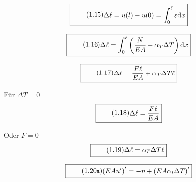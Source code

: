 \documentclass[11pt]{article}
\newcommand{\1}{ {\mathds{1}} }
\begin{document}
    \begin{equation}
      \boxed{
        \tag{1.15}
        \begin{split}
          \Delta \ell
          =
          u(l)
          -
          u(0)
          =
          \int_{0}^{\ell}
          \varepsilon
          \text{d}x
        \end{split}
      }
    \end{equation}
     
    \begin{equation}
      \boxed{
        \tag{1.16}
        \begin{split}
          \Delta \ell
          =
          \int_{0}^{\ell}
          \left(
            \frac{N}{EA}
            +
            \alpha_T \Delta T
          \right)
          \text{d}x
        \end{split}
      }
    \end{equation}

    \begin{equation}
      \boxed{
        \tag{1.17}
        \begin{split}
          \Delta \ell
          =
          \frac{F\ell}{EA}
          +
          \alpha_T \Delta T \ell
        \end{split}
      }
    \end{equation}


    Für $\Delta T = 0$
    \begin{equation}
      \boxed{
        \tag{1.18}
        \begin{split}
          \Delta \ell
          =
          \frac{F\ell}{EA}
        \end{split}
      }
    \end{equation}

    Oder $F = 0$
    \begin{equation}
      \boxed{
        \tag{1.19}
        \begin{split}
          \Delta \ell
          =
          \alpha_T \Delta T \ell
        \end{split}
      }
    \end{equation}
    
    \begin{equation}
      \boxed{
        \tag{1.20a}
        \begin{split}
          \left(
            EA u'
          \right)'
          =
          -n
          +
          \left(
            EA \alpha_t \Delta T
          \right)'
        \end{split}
      }
    \end{equation}
\end{document}
